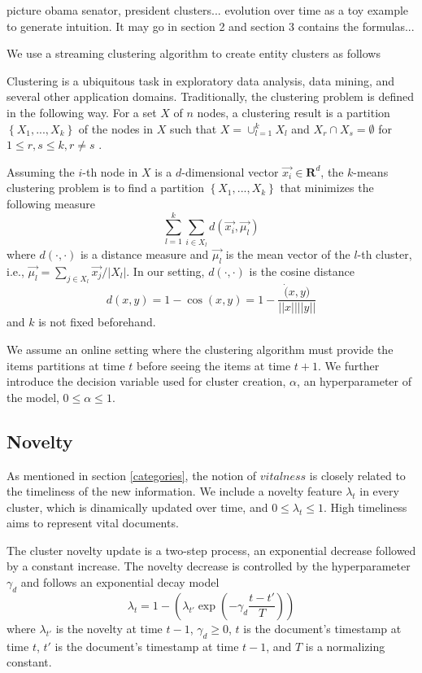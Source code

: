 \documentclass{article}
\begin{document}
picture obama senator, president clusters... evolution over time as a toy example to generate intuition. It may go in section 2 and section 3 contains the formulas... 

We use a streaming clustering algorithm to create entity clusters as follows

Clustering is a ubiquitous task in exploratory data analysis, data mining, and several other application domains. %
Traditionally, the clustering problem is defined in the following way. For a set $X$ of $n$ nodes, a clustering result is a partition $\left\{ {X_1, ..., X_k}\right\}$ of the nodes in $X$ such that $X=\cup_{l=1}^{k}{X_l}$ and $X_r \cap X_s = \emptyset$ for $1 \leq r,s \leq k, r \ne s$ \cite{ChiSZHT07}.

Assuming the $i$-th node in $X$ is a $d$-dimensional vector $\vec{x_i} \in \mathbf{R}^d$, the $k$-means clustering problem is to find a partition $\left\{ {X_1, ..., X_k}\right\}$ that minimizes the following measure
\begin{equation}
\sum_{l=1}^{k} \sum_{i \in X_l} d(\vec{x_i},\vec{\mu_l})
\end{equation}
where $d(\cdot,\cdot)$ is a distance measure and $\vec{\mu_l}$ is the mean vector of the $l$-th cluster, i.e., $\vec{\mu_l} = \sum_{j \in X_l}{\vec{x_j}/|X_l|}$.
In our setting, $d(\cdot,\cdot)$ is the cosine distance
\begin{equation}
d(x,y) = 1 - \cos(x,y) = 1 - \frac{\dot(x,y)}{||x||||y||}
\end{equation}
and $k$ is not fixed beforehand.

We assume an online setting where the clustering algorithm must provide the items partitions at time $t$ before seeing the items at time $t+1$. We further introduce the decision variable used for cluster creation, $\alpha$, an hyperparameter of the model, $0 \leq \alpha \leq 1$.

\subsection{Novelty}
\label{novelty}

As mentioned in section \ref{categories}, the notion of $vitalness$ is closely related to the timeliness of the new information. We include a novelty feature $\lambda_t$ in every cluster, which is dinamically updated over time, and $0 \leq \lambda_t \leq 1$. High timeliness aims to represent vital documents.

The cluster novelty update is a two-step process, an exponential decrease followed by a constant increase.
The novelty decrease is controlled by the hyperparameter $\gamma_d$ and follows an exponential decay model
\begin{equation}
\label{decrease}
\lambda_t = 1 - (\lambda_{t'} \exp{(-\gamma_d \frac{t-t'}{T})})
\end{equation}
where $\lambda_{t'}$ is the novelty at time $t-1$, $\gamma_d \geq 0$, $t$ is the document's timestamp at time $t$, $t'$ is the document's timestamp at time $t-1$, and $T$ is a normalizing constant.
\end{document}

